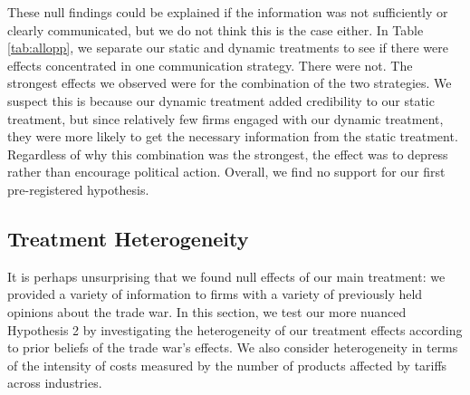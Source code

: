 \documentclass{article}
\begin{document}
These null findings could be explained if the information was not sufficiently or clearly communicated, but we do not think this is the case either. In Table \ref{tab:allopp}, we separate our static and dynamic treatments to see if there were effects concentrated in one communication strategy. There were not. The strongest effects we observed were for the combination of the two strategies. We suspect this is because our dynamic treatment added credibility to our static treatment, but since relatively few firms engaged with our dynamic treatment, they were more likely to get the necessary information from the static treatment. Regardless of why this combination was the strongest, the effect was to depress rather than encourage political action. Overall, we find no support for our first pre-registered hypothesis. 







\subsection{Treatment Heterogeneity}

It is perhaps unsurprising that we found null effects of our main treatment: we provided a variety of information to firms with a variety of previously held opinions about the trade war. In this section, we test our more nuanced Hypothesis 2 by investigating the heterogeneity of our treatment effects according to prior beliefs of the trade war's effects. We also consider heterogeneity in terms of the intensity of costs measured by the number of products affected by tariffs across industries.
\end{document}
